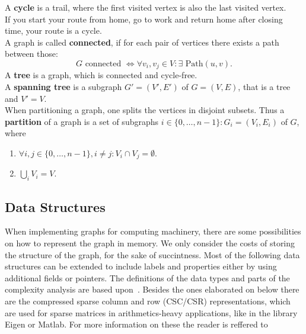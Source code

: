             A \textbf{cycle} is a trail, where the first visited vertex is also the last visited vertex. \\
            If you start your route from home, go to work and return home after closing time, your route is a cycle.\\
            
            A graph is called \textbf{connected}, if for each pair of vertices there exists a path between those: 
            \[G \text{ connected } \Leftrightarrow \forall v_i, v_j \in V: \exists \text{ Path}(u, v).\]
            A \textbf{tree} is a graph, which is connected and cycle-free. \\
            A \textbf{spanning tree} is a subgraph $G' = (V', E')$ of $G = (V, E)$, that is a tree and $V' = V$. \\
            
            When partitioning a graph, one splits the vertices in disjoint subsets. 
            Thus a \textbf{partition} of a graph is a set of subgraphs $i\in \{0, \dots, n-1\}: G_i = (V_i, E_i)$ of $G$, where 
            \begin{enumerate}
             \item $\forall i,j \in \{0, \dots, n-1\}, i \neq j: V_i \cap V_j = \emptyset$.
             \item $\bigcup_i V_i = V$.
            \end{enumerate}
            
    \subsection{Data Structures}\label{\positionnumber}
        When implementing graphs for computing machinery, there are some possibilities on how to represent the graph in memory.
        We only consider the costs of storing the structure of the graph, for the sake of succintness. 
        Most of the following data structures can be extended to include labels and properties either by using additional fields or pointers. 
        The definitions of the data types and parts of the complexity analysis are based upon~\autocite{Gross1998GraphTA, aho1974design, cormen2009introduction, Goodrich2014AlgorithmDA, steinhaus2010g}. 
        Besides the ones elaborated on below there are the compressed sparse column and row (CSC/CSR) representations, which are used for sparse matrices in arithmetics-heavy applications, like in the library Eigen or Matlab. 
        For more information on these the reader is reffered to~\autocite{steinhaus2010g, Eisenstat1982YaleSM}
        
